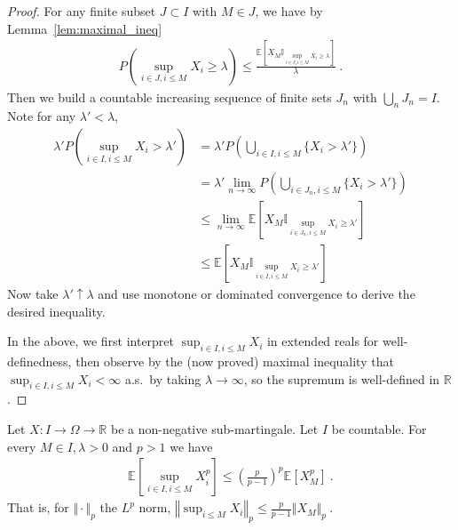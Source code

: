 \begin{proof}
For any finite subset $J \subset I$ with $M \in J$, we have by Lemma~\ref{lem:maximal_ineq}
\begin{align*}
  P\left( \sup_{i\in J, i \le M}X_i\geq\lambda \right)
  \le \frac{\mathbb{E}\left[X_{M} \mathbb{I}_{\sup_{i \in J, i \le M}X_i \ge \lambda}\right]}{\lambda}
  \: .
\end{align*}
Then we build a countable increasing sequence of finite sets $J_n$ with $\bigcup_nJ_n=I$.
Note for any $\lambda' < \lambda$,
\begin{align*}
  \lambda' P\left( \sup_{i\in I, i\leq M}X_i>\lambda' \right)
  &= \lambda' P\left( \bigcup_{i\in I, i\leq M}\{X_i>\lambda'\} \right) \\
  &= \lambda' \lim_{n\to\infty} P\left( \bigcup_{i\in J_n, i\leq M}\{X_i>\lambda'\} \right) \\
  &\le \lim_{n\to\infty} \mathbb{E}\left[X_{M} \mathbb{I}_{\sup_{i \in J_n, i \le M}X_i \ge \lambda'}\right] \\
  &\le \mathbb{E}\left[X_{M} \mathbb{I}_{\sup_{i \in I, i \le M}X_i \ge \lambda'}\right]
\end{align*}
Now take $\lambda'\uparrow\lambda$ and use monotone or dominated convergence to derive the desired inequality.

In the above, we first interpret $\sup_{i\in I, i\leq M}X_i$ in extended reals for well-definedness,
then observe by the (now proved) maximal inequality that $\sup_{i\in I, i\leq M}X_i < \infty$ a.s.\ by taking $\lambda\to\infty$,
so the supremum is well-defined in $\mathbb{R}$.
\end{proof}


\begin{lemma}\label{lem:doob_Lp_countable}
  Let $X : I \rightarrow \Omega \rightarrow \mathbb{R}$ be a non-negative sub-martingale. Let $I$ be countable.
  For every $M\in I,\lambda > 0$ and $p>1$ we have
  \begin{align*}
    \mathbb{E}\left[ \sup_{i\in I, i \leq M}X_i^p \right]
    \leq \left(\frac{p}{p-1}\right)^p\mathbb{E}[X_M^p]
    \: .
  \end{align*}
  That is, for $\Vert \cdot \Vert_p$ the $L^p$ norm,
  $\left\Vert \sup_{i \le M}  X_i  \right\Vert_p
    \leq \frac{p}{p-1} \left\Vert X_M \right\Vert_p
    \: .$
\end{lemma}

